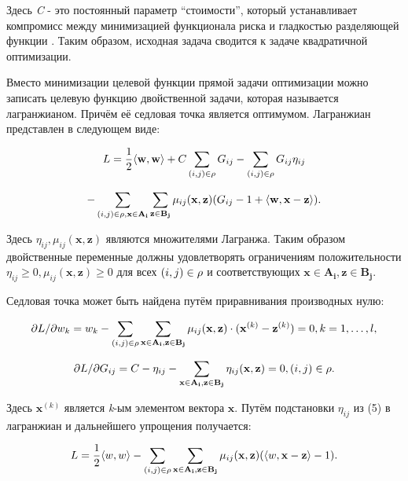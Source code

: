 \documentclass[12pt,a4paper,oneside]{article}
\begin{document}
\par
Здесь \emph{C} - это постоянный параметр ``стоимости'', который устанавливает компромисс между минимизацией функционала риска и гладкостью разделяющей функции . 
Таким образом, исходная задача сводится к задаче квадратичной оптимизации. 

\par
Вместо минимизации целевой функции прямой задачи оптимизации можно записать целевую функцию двойственной задачи, которая называется лагранжианом. 
Причём её седловая точка является оптимумом. 
Лагранжиан представлен в следующем виде:

\[
L = \frac{1}{2} \langle \mathbf{w}, \mathbf{w} \rangle + C \sum \limits_{(i, j) \in \mathrm{\rho}} G_{ij} - \sum \limits_{(i, j) \in \mathrm{\rho}} G_{ij} \eta_{ij}
\]

\[
- \sum \limits_{(i, j) \in \mathrm{\rho}, \mathbf{x} \in \mathbf{A_i}} \sum \limits_{\mathbf{z} \in \mathbf{B_j}} \mu_{ij}(\mathbf{x}, \mathbf{z}) (G_{ij} - 1 + \langle \mathbf{w}, \mathbf{x} - \mathbf{z} \rangle).
\]

\par
Здесь \(\eta_{ij}, \mu_{ij}(\mathbf{x}, \mathbf{z})\) являются множителями Лагранжа. 
Таким образом двойственные переменные должны удовлетворять ограничениям положительности \(\eta_{ij} \geq 0, \mu_{ij} (\mathbf{x}, \mathbf{z}) \geq 0\) для всех \((i, j) \in \mathrm{\rho}\) и соответствующих \(\mathbf{x} \in \mathbf{A_i}, \mathbf{z} \in \mathbf{B_j}\). 

\par
Седловая точка может быть найдена путём приравнивания производных нулю:

\[
\partial L / \partial w_k = w_k - \sum \limits_{(i, j) \in \mathrm{\rho}} \sum \limits_{\mathbf{x} \in \mathbf{A_i}, \mathbf{z} \in \mathbf{B_j}} \mu_{ij} (\mathbf{x}, \mathbf{z}) \cdot (\mathbf{x}^{(k)} - \mathbf{z}^{(k)}) = 0, k = 1, \dots, l,
\]

\[
\partial L / \partial G_{ij} = C - \eta_{ij} - \sum \limits_{\mathbf{x} \in \mathbf{A_i}, \mathbf{z} \in \mathbf{B_j}} \eta_{ij}(\mathbf{x}, \mathbf{z}) = 0, (i, j) \in \mathrm{\rho}. 
\]

\par
Здесь \(\mathbf{x}^{(k)}\) является \emph{k}-ым элементом вектора \(\mathbf{x}\). 
Путём подстановки \(\eta_{ij}\) из (5) в лагранжиан и дальнейшего упрощения получается:

\[
L = \frac{1}{2} \langle w, w \rangle - \sum \limits_{(i, j) \in \mathrm{\rho}} \sum \limits_{\mathbf{x} \in \mathbf{A_i}, \mathbf{z} \in \mathbf{B_j}} \mu_{ij} (\mathbf{x}, \mathbf{z}) (\langle w, \mathbf{x} - \mathbf{z} \rangle - 1).
\]
\end{document}
